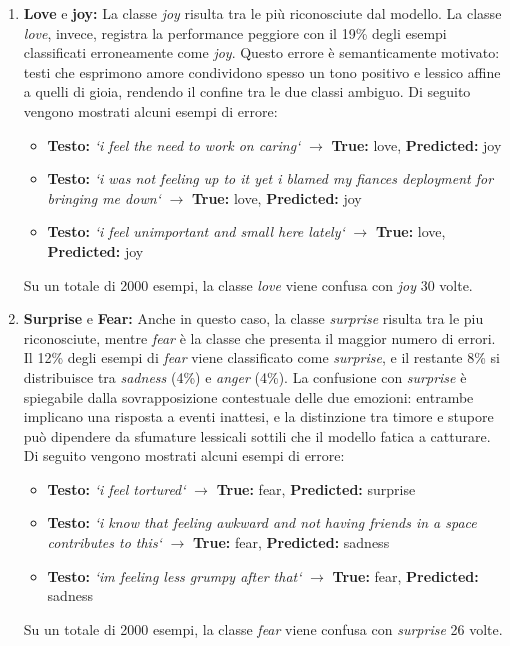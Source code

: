 \documentclass[a4paper,12pt]{article}
\begin{document}
\begin{enumerate}
    \item \textbf{Love} e \textbf{joy:} La classe \textit{joy} risulta tra le più riconosciute dal modello. La classe \textit{love}, invece, registra la performance peggiore con il 19\% degli esempi classificati erroneamente come \textit{joy}. Questo errore è semanticamente motivato: testi che esprimono amore condividono spesso un tono positivo e lessico affine a quelli di gioia, rendendo il confine tra le due classi ambiguo. Di seguito vengono mostrati alcuni esempi di errore:
          \begin{itemize}
              \item \textbf{Testo:} \textit{`i feel the need to work on caring`} $\rightarrow$ \textbf{True:} love,
                    \textbf{Predicted:} joy
              \item \textbf{Testo:} \textit{`i was not feeling up to it yet i blamed my fiances deployment for bringing me down`} $\rightarrow$ \textbf{True:} love,
                    \textbf{Predicted:} joy
              \item \textbf{Testo:} \textit{`i feel unimportant and small here lately`} $\rightarrow$ \textbf{True:} love,
                    \textbf{Predicted:} joy
          \end{itemize}
          Su un totale di 2000 esempi, la classe \textit{love} viene confusa con \textit{joy} 30 volte.

    \item \textbf{Surprise} e \textbf{Fear:} Anche in questo caso, la classe \textit{surprise} risulta tra le piu riconosciute, mentre \textit{fear} è la classe che presenta il maggior numero di errori. Il 12\% degli esempi di \textit{fear} viene classificato come \textit{surprise}, e il restante 8\% si distribuisce tra \textit{sadness} (4\%) e \textit{anger} (4\%). La confusione con \textit{surprise} è spiegabile dalla sovrapposizione contestuale delle due emozioni: entrambe implicano una risposta a eventi inattesi, e la distinzione tra timore e stupore può dipendere da sfumature lessicali sottili che il modello fatica a catturare. Di seguito vengono mostrati alcuni esempi di errore:
          \begin{itemize}
              \item \textbf{Testo:} \textit{`i feel tortured`} $\rightarrow$ \textbf{True:} fear,
                    \textbf{Predicted:} surprise
              \item \textbf{Testo:} \textit{`i know that feeling awkward and not having friends in a space contributes to this`} $\rightarrow$ \textbf{True:} fear,
                    \textbf{Predicted:} sadness
              \item \textbf{Testo:} \textit{`im feeling less grumpy after that`} $\rightarrow$ \textbf{True:} fear,
                    \textbf{Predicted:} sadness
          \end{itemize}
          Su un totale di 2000 esempi, la classe \textit{fear} viene confusa con \textit{surprise} 26 volte.
\end{enumerate}
\end{document}
